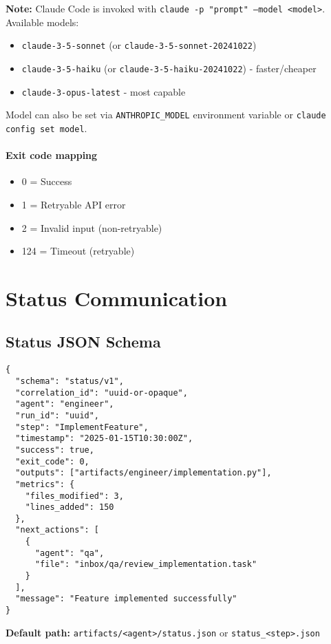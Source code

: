 \documentclass[11pt,a4paper]{article}
\begin{document}
\textbf{Note:} Claude Code is invoked with \texttt{claude -p "prompt" --model <model>}. Available models:
\begin{itemize}
    \item \texttt{claude-3-5-sonnet} (or \texttt{claude-3-5-sonnet-20241022})
    \item \texttt{claude-3-5-haiku} (or \texttt{claude-3-5-haiku-20241022}) - faster/cheaper
    \item \texttt{claude-3-opus-latest} - most capable
\end{itemize}

Model can also be set via \texttt{ANTHROPIC\_MODEL} environment variable or \texttt{claude config set model}.

\paragraph{Exit code mapping}
\begin{itemize}
    \item 0 = Success
    \item 1 = Retryable API error
    \item 2 = Invalid input (non-retryable)
    \item 124 = Timeout (retryable)
\end{itemize}

\section{Status Communication}

\subsection{Status JSON Schema}

\begin{lstlisting}[caption={Status JSON Schema}]
{
  "schema": "status/v1",
  "correlation_id": "uuid-or-opaque",
  "agent": "engineer",
  "run_id": "uuid",
  "step": "ImplementFeature",
  "timestamp": "2025-01-15T10:30:00Z",
  "success": true,
  "exit_code": 0,
  "outputs": ["artifacts/engineer/implementation.py"],
  "metrics": {
    "files_modified": 3,
    "lines_added": 150
  },
  "next_actions": [
    {
      "agent": "qa",
      "file": "inbox/qa/review_implementation.task"
    }
  ],
  "message": "Feature implemented successfully"
}
\end{lstlisting}

\textbf{Default path:} \texttt{artifacts/<agent>/status.json} or \texttt{status\_<step>.json}
\end{document}
